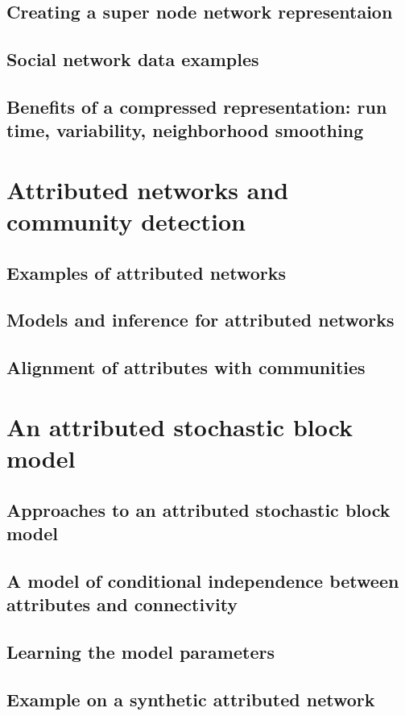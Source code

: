 \section{Creating a super node network representaion}
\section{Social network data examples}
\section{Benefits of a compressed representation: run time, variability, neighborhood smoothing}

\chapter{Attributed networks and community detection}
\section{Examples of attributed networks}
\section{Models and inference for attributed networks}
\section{Alignment of attributes with communities}

\chapter{An attributed stochastic block model}
\section{Approaches to an attributed stochastic block model}
\section{A model of conditional independence between attributes and connectivity}
\section{Learning the model parameters}
\section{Example on a synthetic attributed network}
